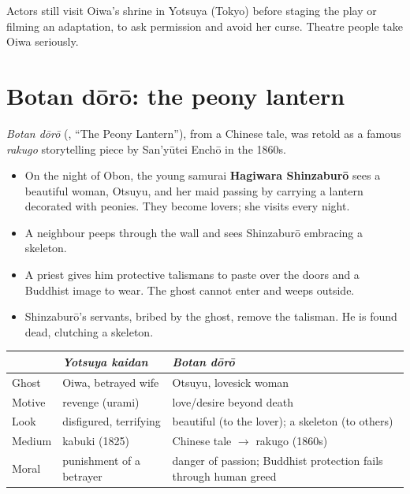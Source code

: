 \begin{aside}
Actors still visit Oiwa's shrine in Yotsuya (Tokyo) before staging the play or filming an
adaptation, to ask permission and avoid her curse. Theatre people take Oiwa seriously.
\end{aside}

\section{Botan dōrō: the peony lantern}

\emph{Botan dōrō} (, ``The Peony Lantern''), from a Chinese tale, was retold as
a famous \emph{rakugo} storytelling piece by San'yūtei Enchō in the 1860s.

\begin{itemize}
  \item On the night of Obon, the young samurai \textbf{Hagiwara Shinzaburō} sees a
        beautiful woman, Otsuyu, and her maid passing by carrying a lantern decorated with
        peonies. They become lovers; she visits every night.
  \item A neighbour peeps through the wall and sees Shinzaburō embracing a skeleton.
  \item A priest gives him protective talismans to paste over the doors and a Buddhist
        image to wear. The ghost cannot enter and weeps outside.
  \item Shinzaburō's servants, bribed by the ghost, remove the talisman. He is found dead,
        clutching a skeleton.
\end{itemize}

\begin{center}
\begin{tabular}{p{3cm}p{5cm}p{5cm}}
\toprule
 & \emph{Yotsuya kaidan} & \emph{Botan dōrō} \\
\midrule
Ghost & Oiwa, betrayed wife & Otsuyu, lovesick woman \\
Motive & revenge (urami) & love/desire beyond death \\
Look & disfigured, terrifying & beautiful (to the lover); a skeleton (to others) \\
Medium & kabuki (1825) & Chinese tale $\to$ rakugo (1860s) \\
Moral & punishment of a betrayer & danger of passion; Buddhist protection fails through human greed \\
\bottomrule
\end{tabular}
\end{center}

